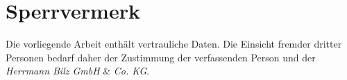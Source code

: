 
\chapter*{Sperrvermerk}

Die vorliegende Arbeit enthält vertrauliche Daten. Die Einsicht fremder dritter Personen bedarf daher der Zustimmung der verfassenden Person und der \textit{Herrmann Bilz GmbH} \& \textit{Co. KG}.